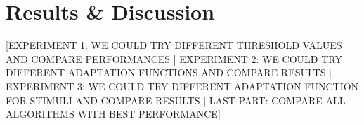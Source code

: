 \chapter{Results \& Discussion}
[EXPERIMENT 1: WE COULD TRY DIFFERENT THRESHOLD VALUES AND COMPARE PERFORMANCES | EXPERIMENT 2: WE COULD TRY DIFFERENT ADAPTATION FUNCTIONS AND COMPARE RESULTS | EXPERIMENT 3: WE COULD TRY DIFFERENT ADAPTATION FUNCTION FOR STIMULI AND COMPARE RESULTS | LAST PART: COMPARE ALL ALGORITHMS WITH BEST PERFORMANCE]